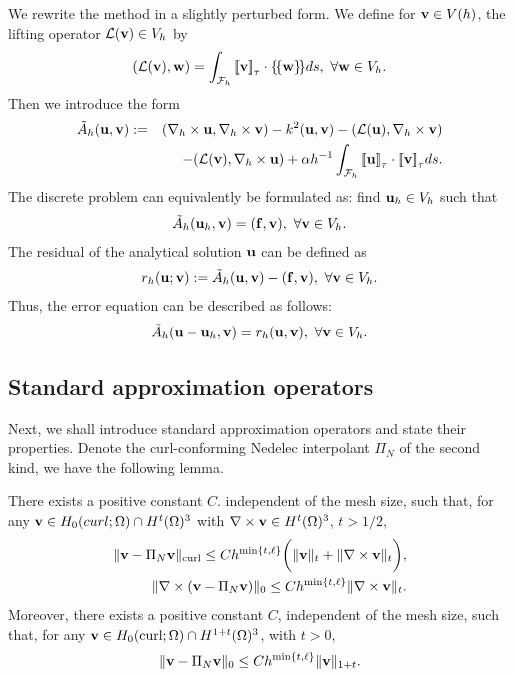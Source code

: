 \documentclass[final,leqno]{siamltex704}
\newcommand{\bv}{{\bf v}}
\def\bbf{{\bf f}}
\def\bu{{\bf u}}
\def\bv{{\bf v}}
\def\bw{{\bf w}}
\def\mL{{\mathcal L}}
\def\mF{\mathcal{F}}
\def\ljump{{[\![}}
\def\rjump{{]\!]}}
\def\lavg{{\{\!\{}}
\def\ravg{{\}\!\}}}
\begin{document}
We rewrite the method in a slightly perturbed form. We define for $\bv\in V(h)$, the lifting operator $\mL(\bv)\in V_h$ by
\begin{eqnarray*}
(\mL(\bv),\bw)=\int_{\mF_h}\ljump\bv\rjump_{\tau}\cdot\lavg\bw\ravg ds,\ \forall\bw\in V_h.
\end{eqnarray*}
Then we introduce the form
\begin{eqnarray*}
\tilde{A}_h(\bu,\bv):=&&(\nabla_h\times\bu,\nabla_h\times\bv)-k^2(\bu,\bv)-(\mL(\bu),\nabla_h\times\bv)\\
&&-(\mL(\bv),\nabla_h\times\bu)+\alpha h^{-1}\int_{\mF_h}\ljump\bu\rjump_{\tau}\cdot\ljump\bv\rjump_{\tau}ds.
\end{eqnarray*}
The discrete problem can equivalently be formulated as: find $\bu_h\in V_h$ such that
\begin{eqnarray}
\tilde{A}_h(\bu_h,\bv)=(\bbf,\bv),\ \forall \bv\in V_h.
\end{eqnarray}
The residual of the analytical solution $\bu$ can be defined as
\begin{eqnarray}
r_h(\bu;\bv):=\tilde{A}_h(\bu,\bv)-(\bbf,\bv),\ \forall\bv\in V_h.
\end{eqnarray}
Thus, the error equation can be described as follows:
\begin{eqnarray}
\tilde{A}_h(\bu-\bu_h,\bv)=r_h(\bu,\bv),\ \forall \bv\in V_h.
\end{eqnarray}

\subsection{Standard approximation operators}
Next, we shall introduce standard approximation operators and state their properties. Denote the curl-conforming Nedelec interpolant $\Pi_N$ of the second kind, we have the following lemma.
\begin{lemma}
There exists a positive constant $C$. independent of the mesh size, such that, for any $\bv\in H_0(curl;\Omega)\cap H^t(\Omega)^3$ with $\nabla\times\bv\in H^t(\Omega)^3$, $t>1/2,$
\begin{eqnarray}
\|\bv-\Pi_N\bv\|_{\text{curl}}\le Ch^{\min\{t,\ell\}}\bigg(\|\bv\|_t+\|\nabla\times\bv\|_t\bigg),\\
\|\nabla\times(\bv-\Pi_N\bv)\|_0\le Ch^{\min\{t,\ell\}}\|\nabla\times\bv\|_t.
\end{eqnarray}
Moreover, there exists a positive constant $C$, independent of the mesh size, such that, for any $\bv\in H_0(\text{curl};\Omega)\cap H^{1+t}(\Omega)^3$, with $t>0$,
\begin{eqnarray}
\|\bv-\Pi_N\bv\|_0\le Ch^{\min\{t,\ell\}}\|\bv\|_{1+t}.
\end{eqnarray}
\end{lemma}
\end{document}
